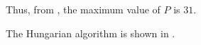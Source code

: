 \begin{subquestions}
\begin{subsubquestions}
Thus, from , the maximum value of $P$ is $31$.

\end{subsubquestions}


\subquestion

\begin{subsubquestions}
	

\subsubquestion

The Hungarian algorithm is shown in .


\end{subsubquestions}
\end{subquestions}
